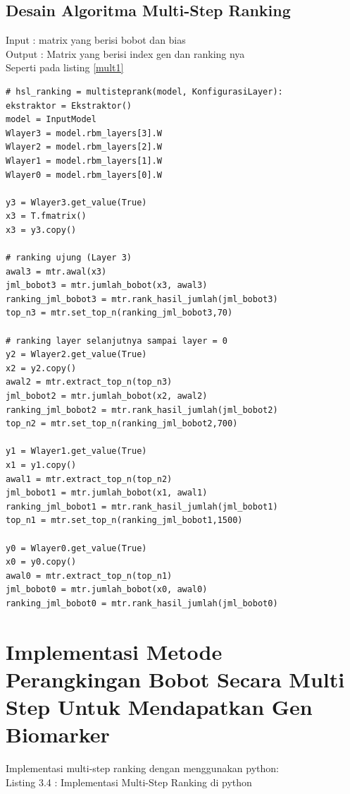 \subsection{ Desain Algoritma Multi-Step Ranking }


Input : matrix yang berisi bobot dan bias \\
Output : Matrix yang berisi index gen dan ranking nya \\
Seperti pada listing \ref{mult1}
\lstset{language=python}          %
\lstset{
  numbers=left,
  firstnumber=1,
  numberfirstline=true
}

\begin{lstlisting}[caption=listing multi step, label=mult1]
# hsl_ranking = multisteprank(model, KonfigurasiLayer):
ekstraktor = Ekstraktor()
model = InputModel
Wlayer3 = model.rbm_layers[3].W
Wlayer2 = model.rbm_layers[2].W
Wlayer1 = model.rbm_layers[1].W
Wlayer0 = model.rbm_layers[0].W

y3 = Wlayer3.get_value(True)
x3 = T.fmatrix()
x3 = y3.copy()

# ranking ujung (Layer 3)
awal3 = mtr.awal(x3)
jml_bobot3 = mtr.jumlah_bobot(x3, awal3)
ranking_jml_bobot3 = mtr.rank_hasil_jumlah(jml_bobot3)
top_n3 = mtr.set_top_n(ranking_jml_bobot3,70)

# ranking layer selanjutnya sampai layer = 0
y2 = Wlayer2.get_value(True)
x2 = y2.copy()
awal2 = mtr.extract_top_n(top_n3)
jml_bobot2 = mtr.jumlah_bobot(x2, awal2)
ranking_jml_bobot2 = mtr.rank_hasil_jumlah(jml_bobot2)
top_n2 = mtr.set_top_n(ranking_jml_bobot2,700)

y1 = Wlayer1.get_value(True)
x1 = y1.copy()
awal1 = mtr.extract_top_n(top_n2)
jml_bobot1 = mtr.jumlah_bobot(x1, awal1)
ranking_jml_bobot1 = mtr.rank_hasil_jumlah(jml_bobot1)
top_n1 = mtr.set_top_n(ranking_jml_bobot1,1500)

y0 = Wlayer0.get_value(True)
x0 = y0.copy()
awal0 = mtr.extract_top_n(top_n1)
jml_bobot0 = mtr.jumlah_bobot(x0, awal0)
ranking_jml_bobot0 = mtr.rank_hasil_jumlah(jml_bobot0)

\end{lstlisting}





\section{Implementasi Metode Perangkingan Bobot Secara Multi Step Untuk Mendapatkan Gen Biomarker}
Implementasi multi-step ranking dengan menggunakan python:\\
Listing 3.4 : Implementasi Multi-Step Ranking di python


